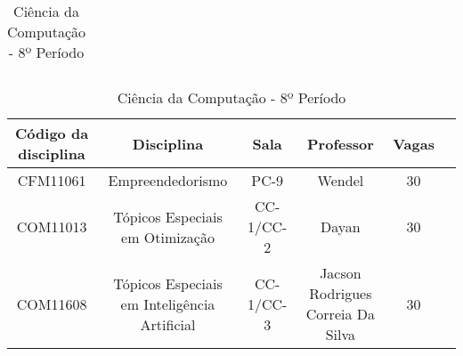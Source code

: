 \begin{apendices}
\begin{table}[!h]
\begin{adjustbox}{width=1\textwidth,center=\textwidth}
\begin{tabular}{|c|c|c|c|c|c|}
\end{tabular}
\end{adjustbox}
\begin{adjustbox}{width=1\textwidth,center=\textwidth}
\centering
\begin{tabular}{|c|c|c|c|c|c|}
\hline
\textbf{Código da disciplina} & \textbf{Disciplina} & \textbf{Sala} & \textbf{Professor} & \textbf{Vagas} \\ \hline
CFM11061 & Empreendedorismo & PC-9 & Wendel & 30 \\ \hline
COM11013 & Tópicos Especiais em Otimização & CC-1/CC-2 & Dayan & 30 \\ \hline
COM11608 & Tópicos Especiais em Inteligência Artificial & CC-1/CC-3 & Jacson Rodrigues Correia Da Silva & 30 \\ \hline

\end{tabular}
\end{adjustbox}
\caption{Ciência da Computação - 8º Período}
\end{table}



\end{apendices}
